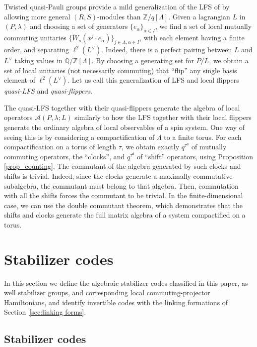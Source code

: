 \documentclass[sn-mathphys-num]{sn-jnl}
\theoremstyle{definition}
\numberwithin{equation}{section}
\theoremstyle{definition}
\def\CA{{\mathcal A}}
\def\IQ{\mathbb{Q}}
\def\IZ{{\mathbb{Z}}}
\def\a{\alpha}
\def\La{{\Lambda}}
\def\l{{\lambda}}
\newcommand{\dd}{{\mathsf{d}}} %
\begin{document}
Twisted quasi-Pauli groups provide a mild generalization of the LFS of \cite{haah2023nontrivial} by allowing more general $(R,S)$-modules than $\IZ/q[\La]$. Given a lagrangian $L$ in $(P,\l)$ and choosing a set of generators $\{e_{\a}\}_{\a\in I}$, we find a set of local mutually commuting unitaries $\{\widetilde{W}_s(x^j\cdot e_{\a})\}_{j\in \La, \a\in I}$, with each element having a finite order, and separating $\ell^2(L^{\vee})$. Indeed, there is a perfect pairing between $L$ and $L^{\vee}$ taking values in $\IQ/\IZ[\La]$. By choosing a generating set for $P/L$, we obtain a set of local unitaries (not necessarily commuting) that ``flip'' any single basis element of $\ell^2(L^{\vee})$. Let us call this generalization of LFS and local flippers \textit{quasi-LFS} and \textit{quasi-flippers}. 

The quasi-LFS together with their quasi-flippers generate the algebra
of local operators $\CA(P,\l;L)$ similarly to how the LFS together
with their local flippers generate the ordinary algebra of local observables of a spin system. One way of seeing this is by considering a compactification of $\La$ to a finite torus.  For each compactification on a torus of length $\tau$, we obtain exactly $q^{\tau^{\dd}}$ of mutually commuting operators, the ``clocks'', and $q^{\tau^{\dd}}$ of ``shift'' operators, using Proposition \ref{prop_counting}. The commutant of the algebra generated by such clocks and shifts is trivial. Indeed, since the clocks generate a maximally commutative subalgebra, the commutant must belong to that algebra. Then, commutation with all the shifts forces the commutant to be trivial. In the finite-dimensional case, we can use the double commutant theorem, which demonstrates that the shifts and clocks generate the full matrix algebra of a system compactified on a torus.

\section{Stabilizer codes}\label{ref:classification}
In this section we define the algebraic stabilizer codes classified in this paper, as well stabilizer groups, and corresponding local commuting-projector Hamiltonians,
and identify invertible codes with the linking formations of
Section~\ref{sec:linking forms}.

\subsection{Stabilizer codes}
\end{document}
